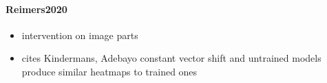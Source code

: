 \paragraph*{Reimers2020}
\cite{Reimers2020}

\begin{itemize}
      \item intervention on image parts 
      \item cites Kindermans, Adebayo constant vector shift and untrained models produce similar heatmaps to trained ones
\end{itemize}